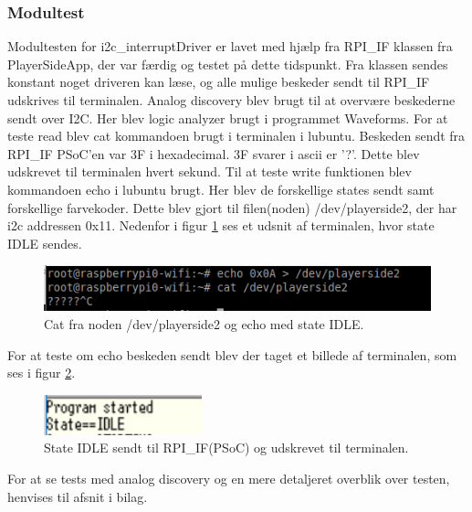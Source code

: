 \documentclass[Rapport/RPi/RPI.tex]{subfiles}
\begin{document}
\subsubsection{Modultest}\label{sec:I2C_interruptDriver_modultest}
Modultesten for i2c\_interruptDriver er lavet med hjælp fra RPI\_IF klassen fra PlayerSideApp, der var færdig og testet på dette tidspunkt. Fra klassen sendes konstant noget driveren kan læse, og alle mulige beskeder sendt til RPI\_IF udskrives til terminalen. Analog discovery blev brugt til at overvære beskederne sendt over I2C. Her blev logic analyzer brugt i programmet Waveforms. For at teste read blev cat kommandoen brugt i terminalen i lubuntu. Beskeden sendt fra RPI\_IF PSoC'en var 3F i hexadecimal. 3F svarer i ascii er '?'. Dette blev udskrevet til terminalen hvert sekund. 
Til at teste write funktionen blev kommandoen echo i lubuntu brugt. Her blev de forskellige states sendt samt forskellige farvekoder. Dette blev gjort til filen(noden) /dev/playerside2, der har i2c addressen 0x11. Nedenfor i figur \ref{fig:echo_cat} ses et udsnit af terminalen, hvor state IDLE sendes.
\begin{figure}[H]
    \centering 
    \includegraphics[width=0.5\linewidth]{Rapport/RPi/graphics/i2C_interruptDriver/cat_echo.png}
    \caption{Cat fra noden /dev/playerside2 og echo med state IDLE.}
    \label{fig:echo_cat}
\end{figure}
For at teste om echo beskeden sendt blev der taget et billede af terminalen, som ses i figur \ref{fig:echo_terminal}.
\begin{figure}[H]
    \centering 
    \includegraphics[width=0.4\linewidth]{Rapport/RPi/graphics/i2C_interruptDriver/echo_terminal.PNG}
    \caption{State IDLE sendt til RPI\_IF(PSoC) og udskrevet til terminalen.}
    \label{fig:echo_terminal}
\end{figure}
For at se tests med analog discovery og en mere detaljeret overblik over testen, henvises til afsnit  i bilag.
\end{document}
